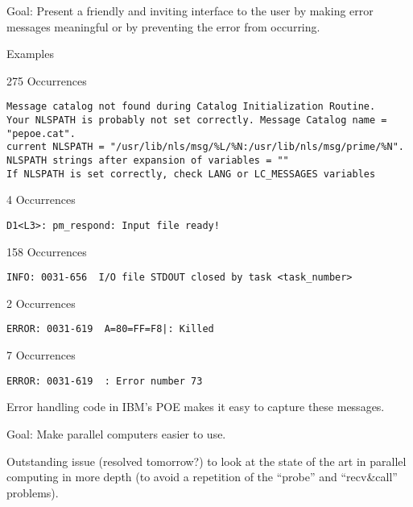 \begin{small}
Goal: Present a friendly and inviting interface to the user by making error
messages meaningful or by preventing the error from occurring.

Examples\\
\begin{tiny}
\begin{mainpts}
\item 275 Occurrences
\begin{verbatim}
Message catalog not found during Catalog Initialization Routine.
Your NLSPATH is probably not set correctly. Message Catalog name = "pepoe.cat".
current NLSPATH = "/usr/lib/nls/msg/%L/%N:/usr/lib/nls/msg/prime/%N".
NLSPATH strings after expansion of variables = ""
If NLSPATH is set correctly, check LANG or LC_MESSAGES variables
\end{verbatim}

\item 4 Occurrences
\begin{verbatim}
D1<L3>: pm_respond: Input file ready!
\end{verbatim}

\item 158 Occurrences
\begin{verbatim}
INFO: 0031-656  I/O file STDOUT closed by task <task_number>
\end{verbatim}

\item 2 Occurrences
\begin{verbatim}
ERROR: 0031-619  A=80=FF=F8|: Killed
\end{verbatim}

\item 7 Occurrences
\begin{verbatim}
ERROR: 0031-619  : Error number 73
\end{verbatim}
\end{mainpts}
\end{tiny}

Error handling code in IBM's POE makes it easy to capture these messages.
\end{small}
\ve

Goal: Make parallel computers easier to use.
\ve

Outstanding issue (resolved tomorrow?) to look at the state of the art in
parallel computing in
more depth (to avoid a repetition of the ``probe'' and ``recv\&call''
problems). 

